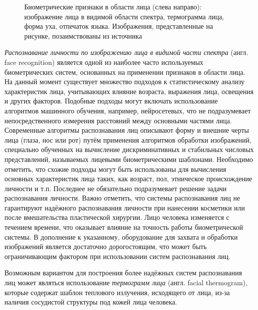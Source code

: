 \documentclass[12pt]{book}
\begin{document}
\begin{figure}[h]
\caption{Биометрические признаки в области лица (слева направо): изображение лица в видимой области спектра, термограмма лица, форма уха, отпечаток языка. Изображения, представленные на рисунке, позаимствованы из источника \cite{unar_2014}}
\label{fig:figure_1_3}
\end{figure}

\large{\textit{Распознавание личности по изображению лица в видимой части спектра} (англ. face recognition) является одной из наиболее часто используемых биометрических систем, основанных на применении признаков в области лица. На данный момент существует множество подходов к статистическому анализу характеристик лица, учитывающих влияние возраста, выражения лица, освещения и других факторов. Подобные подходы могут включать использование алгоритмов машинного обучения, например, нейросетевых, что не подразумевает непосредственного измерения расстояний между основными частями лица. Современные алгоритмы распознавания лиц описывают форму и внешние черты лица (глаза, нос или рот) путём применения алгоритмов обработки изображений, специально обученных на вычисление дискриминативных и стабильных числовых представлений, называемых лицевыми биометрическими шаблонами. Необходимо отметить, что схожие подходы могут быть использованы для вычисления основных характеристик лица таких, как возраст, пол, этническое происхождение личности и т.п. Последнее не обязательно подразумевает решение задачи распознавания личности. Важно отметить, что системы распознавания лиц не гарантируют надёжного распознавания личности при нанесении косметики или после вмешательства пластической хирургии. Лицо человека изменяется с течением времени, что оказывает влияние на точность работы биометрической системы. В дополнение к указанному, оборудование для захвата и обработки изображений является достаточно дорогостоящим, что может быть ограничивающим фактором при использовании систем распознавания лиц.}

\large{Возможным вариантом для построения более надёжных систем распознавания лиц может являться использование \textit{термограмм лица} (англ. facial thermogram), которые содержат шаблон теплового излучения, исходящего от лица, из-за наличия сосудистой структуры под кожей лица человека.}
\end{document}
